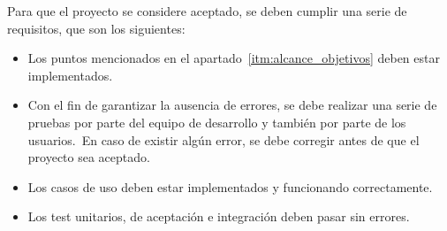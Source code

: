 

Para que el proyecto se considere aceptado, se deben cumplir una serie de requisitos, que son los siguientes:

\begin{itemize}
	\item Los puntos mencionados en el apartado~\ref{itm:alcance_objetivos} deben estar implementados.
	\item Con el fin de garantizar la ausencia de errores, se debe realizar una serie de pruebas por parte del equipo
	de desarrollo y también por parte de los usuarios.\ En caso de existir algún error, se debe corregir antes de
	que el proyecto sea aceptado.
	\item Los casos de uso deben estar implementados y funcionando correctamente. %
	\item Los test unitarios, de aceptación e integración deben pasar sin errores.
\end{itemize}
\label{itm:alcance_criterios_aceptacion}

